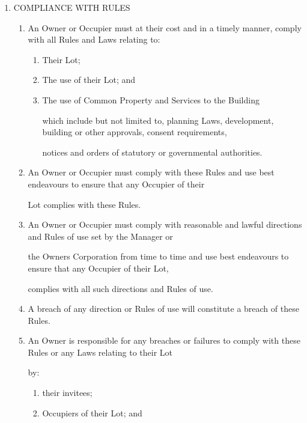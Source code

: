 \documentclass{article}
\begin{document}
\begin{enumerate}[label=\arabic*.]
\begin{enumerate}[label=(\arabic*)]
\end{enumerate}
\item  COMPLIANCE WITH RULES 

\begin{enumerate}[label=\arabic{enumi}.\arabic*.]
\item  An Owner or Occupier must at their cost and in a timely manner, comply with all Rules and Laws relating to: 

\begin{enumerate}[label=(\arabic*)]
\item  Their Lot; 

\item  The use of their Lot; and 

\item  The use of Common Property and Services to the Building 

which include but not limited to, planning Laws, development, building or other approvals, consent requirements, 

notices and orders of statutory or governmental authorities. 

\end{enumerate}
\item  An Owner or Occupier must comply with these Rules and use best endeavours to ensure that any Occupier of their 

Lot complies with these Rules. 

\item  An Owner or Occupier must comply with reasonable and lawful directions and Rules of use set by the Manager or 

the Owners Corporation from time to time and use best endeavours to ensure that any Occupier of their Lot, 

complies with all such directions and Rules of use. 

\newpage

\item  A breach of any direction or Rules of use will constitute a breach of these Rules. 

\item  An Owner is responsible for any breaches or failures to comply with these Rules or any Laws relating to their Lot 

by: 

\begin{enumerate}[label=(\arabic*)]
\item  their invitees; 

\item  Occupiers of their Lot; and 


\end{enumerate}
\end{enumerate}
\end{enumerate}
\end{document}
